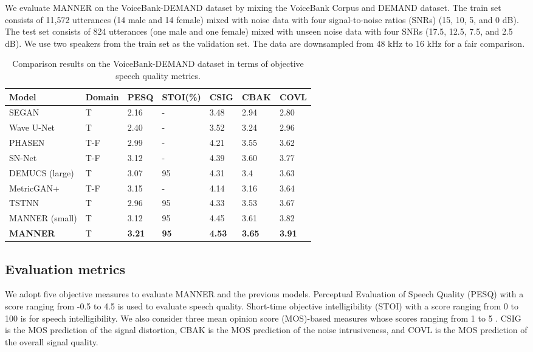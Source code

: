 \documentclass{article}
\begin{document}
We evaluate MANNER on the VoiceBank-DEMAND dataset \cite{valentini2017noisy} by mixing the VoiceBank Corpus and DEMAND dataset. The train set consists of 11,572 utterances (14 male and 14 female) mixed with noise data with four signal-to-noise ratios (SNRs) (15, 10, 5, and 0 dB). The test set consists of 824 utterances (one male and one female) mixed with unseen noise data with four SNRs (17.5, 12.5, 7.5, and 2.5 dB). We use two speakers from the train set as the validation set. The data are downsampled from 48 kHz to 16 kHz for a fair comparison.
\begin{table*}
\caption{Comparison results on the VoiceBank-DEMAND dataset in terms of objective speech quality metrics.}\label{table:comparison}
\centering
\begin{tabular}{M{3cm}M{1.5cm}M{2cm}M{2cm}M{2cm}M{2cm}M{2cm}} \toprule
Model &  Domain  & PESQ & STOI(\%) & CSIG & CBAK & COVL \\
\midrule
SEGAN \cite{pascual2017segan} & T & 2.16 & - & 3.48 & 2.94 & 2.80 \\
Wave U-Net \cite{macartney2018improved} & T & 2.40 & - & 3.52 & 3.24 & 2.96 \\
PHASEN \cite{yin2020phasen} & T-F & 2.99 & - & 4.21 & 3.55 & 3.62 \\
SN-Net \cite{zheng2020interactive} & T-F & 3.12 & - & 4.39 & 3.60 & 3.77 \\
DEMUCS (large) \cite{defossez2020real} & T & 3.07 & 95 & 4.31 & 3.4 & 3.63 \\ 
MetricGAN+ \cite{fu2021metricgan+} & T-F & 3.15 & - & 4.14 & 3.16 & 3.64 \\
TSTNN \cite{wang2021tstnn} & T & 2.96 & 95 & 4.33 & 3.53 & 3.67 \\ 
\midrule
MANNER (small) & T & 3.12 & 95 & 4.45 & 3.61 & 3.82 \\
\textbf{MANNER} & T & \textbf{3.21} & \textbf{95} & \textbf{4.53} & \textbf{3.65} & \textbf{3.91} \\
\bottomrule
\end{tabular}
\end{table*}


\subsection{Evaluation metrics}
\label{sec:metric}
We adopt five objective measures to evaluate MANNER and the previous models. Perceptual Evaluation of Speech Quality (PESQ) \cite{recommendation2001perceptual} with a score ranging from -0.5 to 4.5 is used to evaluate speech quality. Short-time objective intelligibility (STOI) \cite{taal2011algorithm} with a score ranging from 0 to 100 is for speech intelligibility. We also consider three mean opinion score (MOS)-based measures whose scores ranging from 1 to 5 \cite{hu2007evaluation}. CSIG is the MOS prediction of the signal distortion, CBAK is the MOS prediction of the noise intrusiveness, and COVL is the MOS prediction of the overall signal quality.
\end{document}

